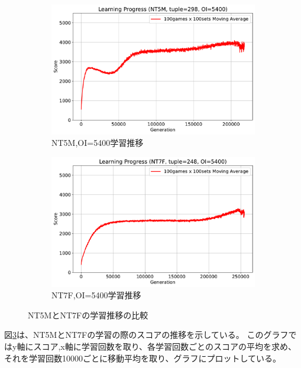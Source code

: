 \begin{figure}[t]
    \vspace{1em}
    \begin{subfigure}[b]{0.49\linewidth}
        \includegraphics[width=\linewidth]{pdf/learning_progress_plots/learning_progress_NT5_tuple298_OI5400.pdf}
        \caption{NT5M,OI=5400学習推移}
        \label{fig:NT5M_OI5400_learning_progress}
    \end{subfigure}
    \begin{subfigure}[b]{0.49\linewidth}
        \includegraphics[width=\linewidth]{pdf/learning_progress_plots/learning_progress_NT7_tuple248_OI5400.pdf}
        \caption{NT7F,OI=5400学習推移}
        \label{fig:NT7F_OI5400_learning_progress}
    \end{subfigure}

    \caption{NT5MとNT7Fの学習推移の比較}
    \label{fig:learning_progress_comparison}
\end{figure}

図\ref{fig:learning_progress_comparison}は、NT5MとNT7Fの学習の際のスコアの推移を示している。
このグラフではy軸にスコア,x軸に学習回数を取り、各学習回数ごとのスコアの平均を求め、
それを学習回数10000ごとに移動平均を取り、グラフにプロットしている。

